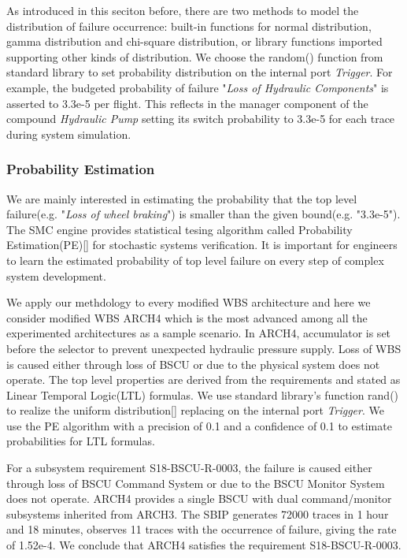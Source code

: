 As introduced in this seciton before, there are two methods to model the distribution of failure occurrence: built-in functions for normal distribution, gamma distribution and chi-square distribution, or library functions imported supporting other kinds of distribution. We choose the random() function from standard library to set probability distribution on the internal port \emph{Trigger}. For example, the budgeted probability of failure "\emph{Loss of Hydraulic Components}" is asserted to 3.3e-5 per flight. This reflects in the manager component of the compound \emph{Hydraulic Pump} setting its switch probability to 3.3e-5 for each trace during system simulation.

\subsubsection{Probability Estimation}
We are mainly interested in estimating the probability that the top level failure(e.g. "\emph{Loss of wheel braking}") is smaller than the given bound(e.g. "3.3e-5"). The SMC engine provides statistical tesing algorithm called Probability Estimation(PE)[] for stochastic systems verification. It is important for engineers to learn the estimated probability of top level failure on every step of complex system development.

We apply our methdology to every modified WBS architecture and here we consider modified WBS ARCH4 which is the most advanced among all the experimented architectures as a sample scenario.
In ARCH4, accumulator is set before the selector to prevent unexpected hydraulic pressure supply. Loss of WBS is caused either through loss of BSCU or due to the physical system does not operate. The top level properties are derived from the requirements and stated as Linear Temporal Logic(LTL) formulas. We use standard library's function rand() to realize the uniform distribution[] replacing on the internal port \emph{Trigger}. We use the PE algorithm with a precision of 0.1 and a confidence of 0.1 to estimate probabilities for LTL formulas. 

For a subsystem requirement S18-BSCU-R-0003, the failure is caused either through loss of BSCU Command System or due to the BSCU Monitor System does not operate. ARCH4 provides a single BSCU with dual command/monitor subsystems inherited from ARCH3. The SBIP generates 72000 traces in 1 hour and 18 minutes, observes 11 traces with the occurrence of failure, giving the rate of 1.52e-4. We conclude that ARCH4 satisfies the requirement S18-BSCU-R-0003.

